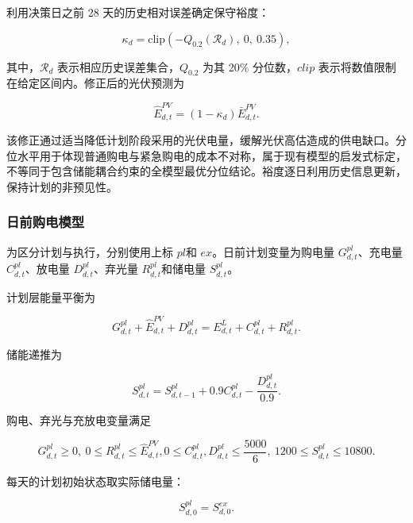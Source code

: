 \documentclass[withoutpreface,bwprint]{cumcmthesis}
\begin{document}
利用决策日之前 28 天的历史相对误差确定保守裕度：

\begin{equation}\kappa_{d} = \mathrm{clip}\left(-Q_{0.2}\left(\mathcal{R}_{d}\right),\ 0,\ 0.35\right),\end{equation}

其中，\(\mathcal{R}_{d}\) 表示相应历史误差集合，\(Q_{0.2}\) 为其 20\%
分位数，\(clip\) 表示将数值限制在给定区间内。修正后的光伏预测为

\begin{equation}{\widehat{E}}_{d,t}^{PV} = \left( 1 - \kappa_{d} \right){\bar{E}}_{d,t}^{PV}.\end{equation}

该修正通过适当降低计划阶段采用的光伏电量，缓解光伏高估造成的供电缺口。分位水平用于体现普通购电与紧急购电的成本不对称，属于现有模型的启发式标定，不等同于包含储能耦合约束的全模型最优分位结论。裕度逐日利用历史信息更新，保持计划的非预见性。

\subsubsection{日前购电模型}

为区分计划与执行，分别使用上标 \(pl\)和 \(ex\)。日前计划变量为购电量
\(G_{d,t}^{pl}\)、充电量 \(C_{d,t}^{pl}\)、放电量
\(D_{d,t}^{pl}\)、弃光量 \(R_{d,t}^{pl}\)和储电量 \(S_{d,t}^{pl}\)。

计划层能量平衡为

\begin{equation}G_{d,t}^{pl} + {\widehat{E}}_{d,t}^{PV} + D_{d,t}^{pl} = E_{d,t}^{L} + C_{d,t}^{pl} + R_{d,t}^{pl}.\end{equation}

储能递推为

\begin{equation}S_{d,t}^{pl} = S_{d,t - 1}^{pl} + 0.9C_{d,t}^{pl} - \frac{D_{d,t}^{pl}}{0.9}.\end{equation}

购电、弃光与充放电变量满足

\begin{equation}{G_{d,t}^{pl} \geq 0,\ 0 \leq R_{d,t}^{pl} \leq {\widehat{E}}_{d,t}^{PV},
}{0 \leq C_{d,t}^{pl},D_{d,t}^{pl} \leq \frac{5000}{6},\ 1200 \leq S_{d,t}^{pl} \leq 10800.}\end{equation}

每天的计划初始状态取实际储电量：

\begin{equation}S_{d,0}^{pl} = S_{d,0}^{ex}.\end{equation}
\end{document}
